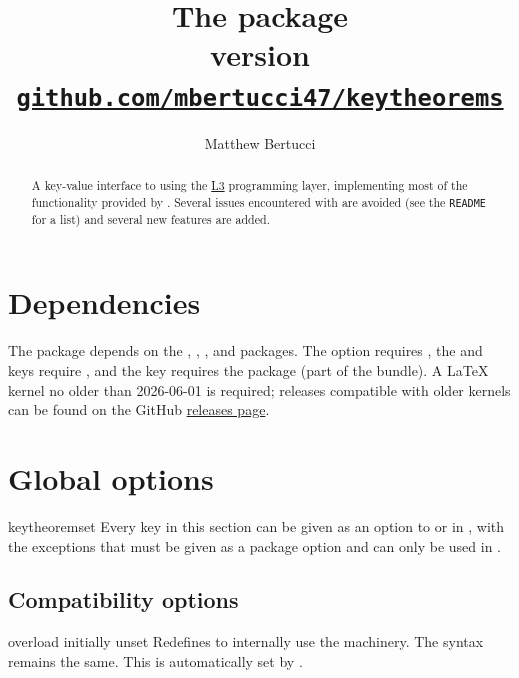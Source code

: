 \documentclass{ltxdoc}
\title{%
  The \pkg{keytheorems} package \\[1ex]
  \large version \keythmsversion \\[1ex]
  \href{https://github.com/mbertucci47/keytheorems}
    {\texttt{github.com/mbertucci47/keytheorems}}
  }
\author{Matthew Bertucci}
\newcommand{\file}{\texttt}
\begin{document}
\maketitle

\begin{abstract}
A key-value interface to  using the \href{https://www.ctan.org/pkg/l3kernel}{L3} programming layer, implementing most of the functionality provided by .
Several issues encountered with  are avoided (see the \file{README} for a list) and several new features are added.
\end{abstract}

\begingroup
\hypersetup{linkcolor=black}
\tableofcontents
\endgroup

\section{Dependencies}

The package depends on the , , , and  packages.
The  option requires , the  and  keys require , and the  key requires the  package (part of the  bundle).
A \LaTeX{} kernel no older than 2026-06-01 is required; releases compatible with older kernels can be found on the GitHub \href{https://github.com/mbertucci47/keytheorems/releases}{releases page}.

\section{Global options}

\begin{docCommand}{keytheoremset}
  {}
Every key in this section can be given as an option to  or in , with the exceptions that  must be given as a package option and  can only be used in .
\end{docCommand}

\subsection{Compatibility options}

\begin{docKey}{overload}
  {}
  {initially unset}
Redefines  to internally use the  machinery.
The syntax remains the same.
This is automatically set by .
\end{docKey}
\end{document}
